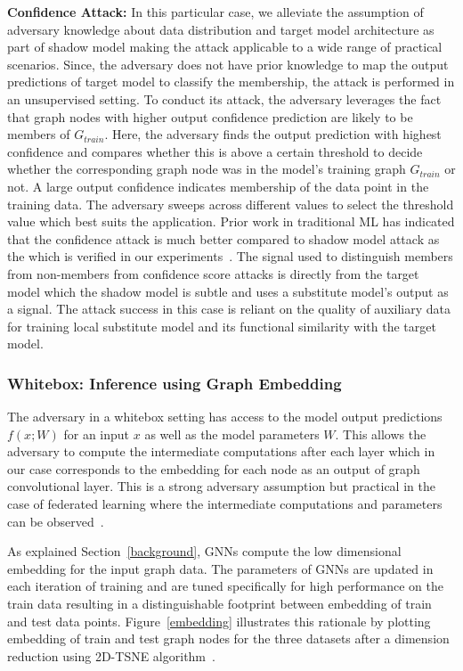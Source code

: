 \noindent\textbf{Confidence Attack:} In this particular case, we alleviate the assumption of adversary knowledge about data distribution and target model architecture as part of shadow model making the attack applicable to a wide range of practical scenarios.
Since, the adversary does not have prior knowledge to map the output predictions of target model to classify the membership, the attack is performed in an unsupervised setting. %
To conduct its attack, the adversary leverages the fact that graph nodes with higher output confidence prediction are likely to be members of $G_{train}$.
Here, the adversary finds the output prediction with highest confidence and compares whether this is above a certain threshold to decide whether the corresponding graph node was in the model's training graph $G_{train}$ or not.
A large output confidence indicates membership of the data point in the training data.
The adversary sweeps across different values to select the threshold value which best suits the application.
Prior work in traditional ML has indicated that the confidence attack is much better compared to shadow model attack as the which is verified in our experiments~\cite{princeton}.
The signal used to distinguish members from non-members from confidence score attacks is directly from the target model which the shadow model is subtle and uses a substitute model's output as a signal.
The attack success in this case is reliant on the quality of auxiliary data for training local substitute model and its functional similarity with the target model.


\subsubsection{Whitebox: Inference using Graph Embedding}

The adversary in a whitebox setting has access to the model output predictions $f(x; W)$ for an input $x$ as well as the model parameters $W$.
This allows the adversary to compute the intermediate computations after each layer which in our case corresponds to the embedding for each node as an output of graph convolutional layer.
This is a strong adversary assumption but practical in the case of federated learning where the intermediate computations and parameters can be observed~\cite{whitebox,collabinf}.

As explained Section~\ref{background}, GNNs compute the low dimensional embedding for the input graph data.
The parameters of GNNs are updated in each iteration of training and are tuned specifically for high performance on the train data resulting in a distinguishable footprint between embedding of train and test data points.
Figure~\ref{embedding} illustrates this rationale by plotting embedding of train and test graph nodes for the three datasets after a dimension reduction using 2D-TSNE algorithm~\cite{tsne}.


